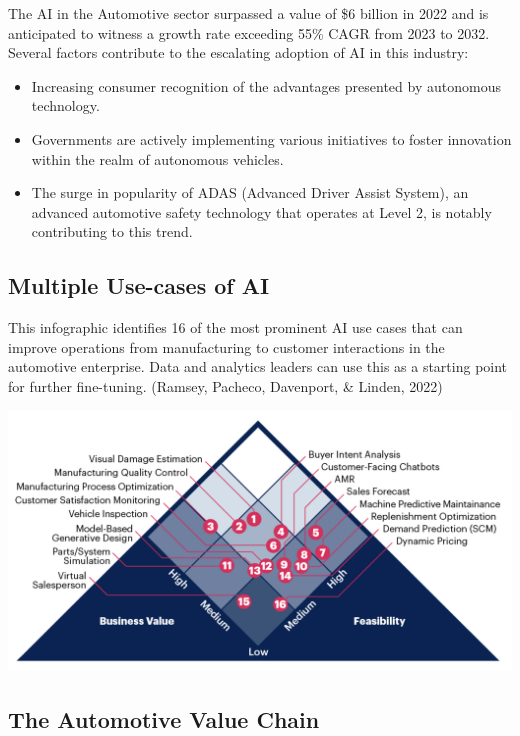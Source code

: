 \documentclass[
]{article}
\begin{document}
The AI in the Automotive sector surpassed a value of \$6 billion in 2022 and is anticipated to witness a growth rate exceeding 55\% CAGR from 2023 to 2032. Several factors contribute to the escalating adoption of AI in this industry:

\begin{itemize}
\item
  Increasing consumer recognition of the advantages presented by autonomous technology.
\item
  Governments are actively implementing various initiatives to foster innovation within the realm of autonomous vehicles.
\item
  The surge in popularity of ADAS (Advanced Driver Assist System), an advanced automotive safety technology that operates at Level 2, is notably contributing to this trend.
\end{itemize}

\hypertarget{multiple-use-cases-of-ai}{%
\subsection{Multiple Use-cases of AI}\label{multiple-use-cases-of-ai}}

This infographic identifies 16 of the most prominent AI use cases that can improve operations from manufacturing to customer interactions in the automotive enterprise. Data and analytics leaders can use this as a starting point for further fine-tuning. (Ramsey, Pacheco, Davenport, \& Linden, 2022)

\includegraphics{Pyramid.png}

\hypertarget{the-automotive-value-chain}{%
\subsection{The Automotive Value Chain}\label{the-automotive-value-chain}}
\end{document}
